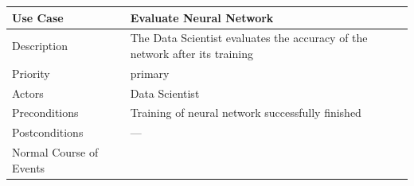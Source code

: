 \begin{longtable}[]{@{}ll@{}}
\toprule
\begin{minipage}[b]{0.27\columnwidth}\raggedright\strut
\textbf{Use Case}\strut
\end{minipage} & \begin{minipage}[b]{0.68\columnwidth}\raggedright\strut
\textbf{Evaluate Neural Network}\strut
\end{minipage}\tabularnewline
\midrule
\endhead
\begin{minipage}[t]{0.27\columnwidth}\raggedright\strut
Description\strut
\end{minipage} & \begin{minipage}[t]{0.68\columnwidth}\raggedright\strut
The Data Scientist evaluates the accuracy of the network after its
training\strut
\end{minipage}\tabularnewline
\begin{minipage}[t]{0.27\columnwidth}\raggedright\strut
Priority\strut
\end{minipage} & \begin{minipage}[t]{0.68\columnwidth}\raggedright\strut
primary\strut
\end{minipage}\tabularnewline
\begin{minipage}[t]{0.27\columnwidth}\raggedright\strut
Actors\strut
\end{minipage} & \begin{minipage}[t]{0.68\columnwidth}\raggedright\strut
Data Scientist\strut
\end{minipage}\tabularnewline
\begin{minipage}[t]{0.27\columnwidth}\raggedright\strut
Preconditions\strut
\end{minipage} & \begin{minipage}[t]{0.68\columnwidth}\raggedright\strut
Training of neural network successfully finished\strut
\end{minipage}\tabularnewline
\begin{minipage}[t]{0.27\columnwidth}\raggedright\strut
Postconditions\strut
\end{minipage} & \begin{minipage}[t]{0.68\columnwidth}\raggedright\strut
---\strut
\end{minipage}\tabularnewline
\begin{minipage}[t]{0.27\columnwidth}\raggedright\strut
Normal Course of Events\strut
\end{minipage} & \begin{minipage}[t]{0.68\columnwidth}\raggedright\strut

\end{minipage}
\end{longtable}
